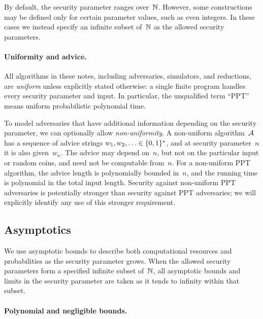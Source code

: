 \documentclass[11pt]{article}
\begin{document}
By default, the security parameter ranges over~$\mathbb{N}$.
However, some constructions may be defined only for certain parameter values, such as even integers.
In these cases we instead specify an infinite subset of~$\mathbb{N}$ as the allowed security parameters.

\paragraph{Uniformity and advice.}

All algorithms in these notes, including adversaries, simulators, and reductions, are \emph{uniform} unless explicitly stated otherwise: a single finite program handles every security parameter and input.
In particular, the unqualified term ``PPT'' means uniform probabilistic polynomial time.

To model adversaries that have additional information depending on the security parameter, we can optionally allow \emph{non-uniformity}.
A non-uniform algorithm~$\mathcal{A}$ has a sequence of advice strings $w_1,w_2,\ldots\in\{0,1\}^*$, and at security parameter~$n$ it is also given~$w_n$.
The advice may depend on~$n$, but not on the particular input or random coins, and need not be computable from~$n$.
For a non-uniform PPT algorithm, the advice length is polynomially bounded in~$n$, and the running time is polynomial in the total input length.
Security against non-uniform PPT adversaries is potentially stronger than security against PPT adversaries; we will explicitly identify any use of this stronger requirement.
\par
\endgroup

\subsection{Asymptotics}
\label{sec:asymptotics}

We use asymptotic bounds to describe both computational resources and probabilities as the security parameter grows.
When the allowed security parameters form a specified infinite subset of~$\mathbb{N}$, all asymptotic bounds and limits in the security parameter are taken as it tends to infinity within that subset.

\paragraph{Polynomial and negligible bounds.}
\end{document}
